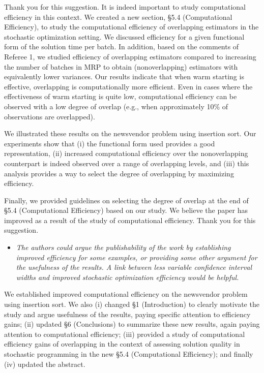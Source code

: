 \documentclass[11pt,notitlepage,onecolumn]{article}
\newcommand{\noi}{\noindent}
\begin{document}
\noi 
Thank you for this suggestion. 
It is indeed important to study computational efficiency in this context. 
We created a new section, \S 5.4 (Computational Efficiency), to study the computational efficiency of overlapping estimators in the stochastic optimization setting. 
We discussed efficiency for a given functional form of the solution time per batch. 
In addition, based on the comments of Referee 1, we studied efficiency of overlapping estimators compared to increasing the number of batches in MRP to obtain (nonoverlapping) estimators with equivalently lower variances. 
Our results indicate that when warm starting is effective, overlapping is computationally more efficient.
Even in cases where the effectiveness of warm starting is quite low, computational efficiency can be observed with a low degree of overlap (e.g., when approximately 10\% of observations are overlapped).\bigskip 

\noi 
We illustrated these results on the newsvendor problem using insertion sort. 
Our experiments show that (i) the functional form used provides a good representation, (ii) increased computational efficiency over the nonoverlapping counterpart is indeed observed over a range of overlapping levels, and (iii) this analysis provides a way to select the degree of overlapping by maximizing efficiency.\bigskip 
 
\noi
Finally, we provided guidelines on selecting the degree of overlap at the end of \S 5.4 (Computational Efficiency) based on our study. 
We believe the paper has improved as a result of the study of computational efficiency. 
Thank you for this suggestion. 
\medskip 


\begin{itemize}
\item[] \textit{The authors could argue the publishability of the work by establishing improved efficiency for some examples, or providing some other argument for the usefulness of the results.  
A link between less variable confidence interval widths and improved stochastic optimization efficiency would be helpful.}
\end{itemize}

\noi 
We established improved computational efficiency on the newsvendor problem using insertion sort.
We also (i) changed \S 1 (Introduction) to clearly motivate the study and argue usefulness of the results, paying specific attention to efficiency gains; (ii) updated \S 6 (Conclusions) to summarize these new results, again paying attention to computational efficiency; (iii) provided a study of computational efficiency gains of overlapping in the context of assessing solution quality in stochastic programming in the new \S 5.4 (Computational Efficiency); and finally (iv) updated the abstract.  
\medskip
\end{document}
